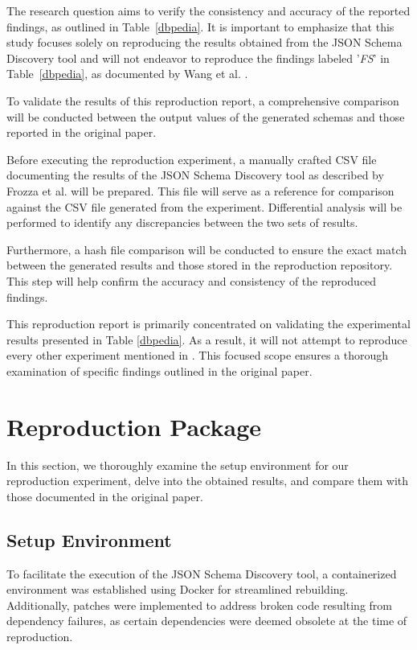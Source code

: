 \documentclass[sigconf, nonacm]{acmart}
\begin{document}
The research question aims to verify the consistency and accuracy of the reported findings, as outlined in Table~\ref{dbpedia}. It is important to emphasize that this study focuses solely on reproducing the results obtained from the JSON Schema Discovery tool and will not endeavor to reproduce the findings labeled '\textit{FS}' in Table~\ref{dbpedia}, as documented by Wang et al. \cite{wang2015schema}.

To validate the results of this reproduction report, a comprehensive comparison will be conducted between the output values of the generated schemas and those reported in the original paper.
 
Before executing the reproduction experiment, a manually crafted CSV file documenting the results of the JSON Schema Discovery tool as described by Frozza et al. \cite{frozza2018approach} will be prepared. This file will serve as a reference for comparison against the CSV file generated from the experiment. Differential analysis will be performed to identify any discrepancies between the two sets of results.

Furthermore, a hash file comparison will be conducted to ensure the exact match between the generated results and those stored in the reproduction repository. This step will help confirm the accuracy and consistency of the reproduced findings. 


This reproduction report is primarily concentrated on validating the experimental results presented in Table \ref{dbpedia}. As a result, it will not attempt to reproduce every other experiment mentioned in \cite{frozza2018approach}. This focused scope ensures a thorough examination of specific findings outlined in the original paper.

\section{Reproduction Package}
In this section, we thoroughly examine the setup environment for our reproduction experiment, delve into the obtained results, and compare them with those documented in the original paper.

\subsection{Setup Environment}
To facilitate the execution of the JSON Schema Discovery tool,  a containerized environment was established using Docker for streamlined rebuilding. Additionally, patches were implemented to address broken code resulting from dependency failures, as certain dependencies were deemed obsolete at the time of reproduction.
\end{document}
